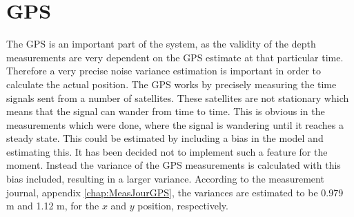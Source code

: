 \section{GPS}
The GPS is an important part of the system, as the validity of the depth measurements are very dependent on the GPS estimate at that particular time. Therefore a very precise noise variance estimation is important in order to calculate the actual position. The GPS works by precisely measuring the time signals sent from a number of satellites. These satellites are not stationary which means that the signal can wander from time to time. This is obvious in the measurements which were done, where the signal is wandering until it reaches a steady state. This could be estimated by including a bias in the model and estimating this. It has been decided not to implement such a feature for the moment. Instead the variance of the GPS measurements is calculated with this bias included, resulting in a larger variance.
According to the measurement journal, appendix \ref{chap:MeasJourGPS}, the variances are estimated to be 0.979 m and 1.12 m, for the $x$ and $y$ position, respectively.

